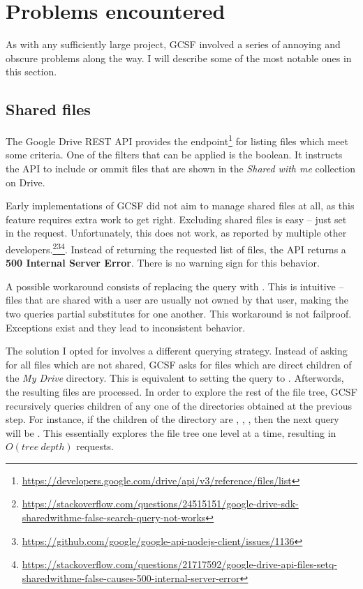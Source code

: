 \section{Problems encountered}

As with any sufficiently large project, GCSF involved a series of annoying and obscure problems along the way. I will describe some of the most notable ones in this section.

\subsection{Shared files} \label{shared_files}

The Google Drive REST API provides the  endpoint\footnote{\url{https://developers.google.com/drive/api/v3/reference/files/list}} for listing files which meet some criteria. One of the filters that can be applied is the  boolean. It instructs the API to include or ommit files that are shown in the \emph{Shared with me} collection on Drive.

Early implementations of GCSF did not aim to manage shared files at all, as this feature requires extra work to get right. Excluding shared files is easy -- just set  in the request. Unfortunately, this does not work, as reported by multiple other developers.\footnote{\url{https://stackoverflow.com/questions/24515151/google-drive-sdk-sharedwithme-false-search-query-not-works}}\footnote{\url{https://github.com/google/google-api-nodejs-client/issues/1136}}\footnote{\url{https://stackoverflow.com/questions/21717592/google-drive-api-files-setq-sharedwithme-false-causes-500-internal-server-error}}. Instead of returning the requested list of files, the API returns a \textbf{500 Internal Server Error}. There is no warning sign for this behavior.

A possible workaround consists of replacing the query with . This is intuitive -- files that are shared with a user are usually not owned by that user, making the two queries partial substitutes for one another. This workaround is not failproof. Exceptions exist and they lead to inconsistent behavior.

The solution I opted for involves a different querying strategy. Instead of asking for all files which are not shared, GCSF asks for files which are direct children of the \emph{My Drive} directory. This is equivalent to setting the query to . Afterwords, the resulting files are processed. In order to explore the rest of the file tree, GCSF recursively queries children of any one of the directories obtained at the previous step. For instance, if the children of the  directory are , , , then the next query will be . This essentially explores the file tree one level at a time, resulting in $ O(tree~depth) $ requests.

